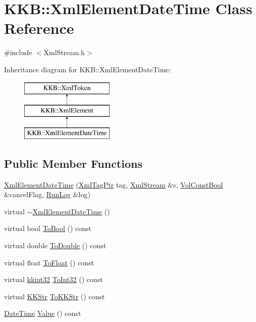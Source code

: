 \hypertarget{class_k_k_b_1_1_xml_element_date_time}{}\section{K\+KB\+:\+:Xml\+Element\+Date\+Time Class Reference}
\label{class_k_k_b_1_1_xml_element_date_time}


{\ttfamily \#include $<$Xml\+Stream.\+h$>$}

Inheritance diagram for K\+KB\+:\+:Xml\+Element\+Date\+Time\+:\begin{figure}[H]
\begin{center}
\leavevmode
\includegraphics[height=3.000000cm]{class_k_k_b_1_1_xml_element_date_time}
\end{center}
\end{figure}
\subsection*{Public Member Functions}
\begin{DoxyCompactItemize}
\item 
\hyperlink{class_k_k_b_1_1_xml_element_date_time_a2ef92882b2e1f0b2d02c5b338daaf372}{Xml\+Element\+Date\+Time} (\hyperlink{namespace_k_k_b_a9253a3ea8a5da18ca82be4ca2b390ef0}{Xml\+Tag\+Ptr} tag, \hyperlink{class_k_k_b_1_1_xml_stream}{Xml\+Stream} \&s, \hyperlink{namespace_k_k_b_a7d390f568e2831fb76b86b56c87bf92f}{Vol\+Const\+Bool} \&cancel\+Flag, \hyperlink{class_k_k_b_1_1_run_log}{Run\+Log} \&log)
\item 
virtual \hyperlink{class_k_k_b_1_1_xml_element_date_time_a9fb359665679473f20a11a0bc06facb9}{$\sim$\+Xml\+Element\+Date\+Time} ()
\item 
virtual bool \hyperlink{class_k_k_b_1_1_xml_element_date_time_a6428fe3132db46ca0f9f15ca4e3570a8}{To\+Bool} () const 
\item 
virtual double \hyperlink{class_k_k_b_1_1_xml_element_date_time_a3c60c809536ad9823baf97f64beb541f}{To\+Double} () const 
\item 
virtual float \hyperlink{class_k_k_b_1_1_xml_element_date_time_a67670c703f86c4a72ba73920de0f4858}{To\+Float} () const 
\item 
virtual \hyperlink{namespace_k_k_b_a8fa4952cc84fda1de4bec1fbdd8d5b1b}{kkint32} \hyperlink{class_k_k_b_1_1_xml_element_date_time_ad7108702555f0d9bc3c879e836d212df}{To\+Int32} () const 
\item 
virtual \hyperlink{class_k_k_b_1_1_k_k_str}{K\+K\+Str} \hyperlink{class_k_k_b_1_1_xml_element_date_time_a0b78fa113b7721069b8a14b971b73b1e}{To\+K\+K\+Str} () const 
\item 
\hyperlink{class_k_k_b_1_1_date_time}{Date\+Time} \hyperlink{class_k_k_b_1_1_xml_element_date_time_ad344da7ca74c2da7c8ab8b1a4263f919}{Value} () const 
\end{DoxyCompactItemize}
